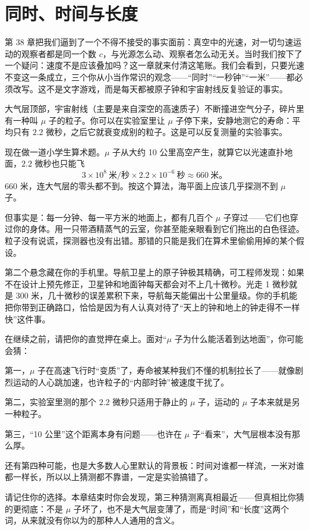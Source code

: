 \chapter{同时、时间与长度}

第 38 章把我们逼到了一个不得不接受的事实面前：真空中的光速，对一切匀速运动的观察者都是同一个数 \(c\)，与光源怎么动、观察者怎么动无关。当时我们按下了一个疑问：速度不是应该叠加吗？这一章就来付清这笔账。我们会看到，只要光速不变这一条成立，三个你从小当作常识的观念——“同时”“一秒钟”“一米”——都必须改写。这不是文字游戏，而是每天都被原子钟和宇宙射线反复验证的事实。


\begin{mainline}
大气层顶部，宇宙射线（主要是来自深空的高速质子）不断撞进空气分子，碎片里有一种叫 \(\mu\) 子的粒子。你可以在实验室里让 \(\mu\) 子停下来，安静地测它的寿命：平均只有 \(2.2\) 微秒，之后它就衰变成别的粒子。这是可以反复测量的实验事实。

现在做一道小学生算术题。\(\mu\) 子从大约 10 公里高空产生，就算它以光速直扑地面，\(2.2\) 微秒也只能飞
\[
3\times10^{8}\ \text{米/秒}\times 2.2\times10^{-6}\ \text{秒}\approx 660\ \text{米}\text{。}
\]
660 米，连大气层的零头都不到。按这个算法，海平面上应该几乎探测不到 \(\mu\) 子。

但事实是：每一分钟、每一平方米的地面上，都有几百个 \(\mu\) 子穿过——它们也穿过你的身体。用一只带酒精蒸气的云室，你甚至能亲眼看到它们拖出的白色径迹。粒子没有说谎，探测器也没有出错。那错的只能是我们在算术里偷偷用掉的某个假设。

第二个悬念藏在你的手机里。导航卫星上的原子钟极其精确，可工程师发现：如果不在设计上预先修正，卫星钟和地面钟每天都会对不上几十微秒。光走 1 微秒就是 300 米，几十微秒的误差累积下来，导航每天能偏出十公里量级。你的手机能把你带到正确路口，恰恰是因为有人认真对待了“天上的钟和地上的钟走得不一样快”这件事。
\end{mainline}


\begin{mainline}
在继续之前，请把你的直觉押在桌上。面对“\(\mu\) 子为什么能活着到达地面”，你可能会猜：

第一，\(\mu\) 子在高速飞行时“变质”了，寿命被某种我们不懂的机制拉长了——就像剧烈运动的人心跳加速，也许粒子的“内部时钟”被速度干扰了。

第二，实验室里测的那个 \(2.2\) 微秒只适用于静止的 \(\mu\) 子，运动的 \(\mu\) 子本来就是另一种粒子。

第三，“10 公里”这个距离本身有问题——也许在 \(\mu\) 子“看来”，大气层根本没有那么厚。

还有第四种可能，也是大多数人心里默认的背景板：时间对谁都一样流，一米对谁都一样长，所以以上猜测都不靠谱，一定是实验搞错了。

请记住你的选择。本章结束时你会发现，第三种猜测离真相最近——但真相比你猜的更彻底：不是 \(\mu\) 子坏了，也不是大气层变薄了，而是“时间”和“长度”这两个词，从来就没有你以为的那种人人通用的含义。
\end{mainline}

